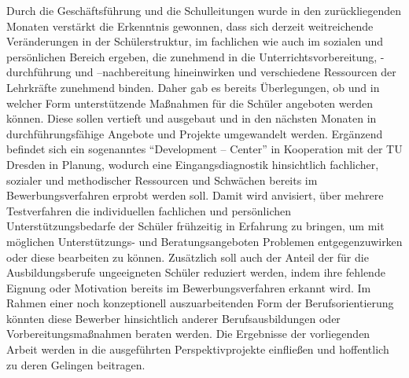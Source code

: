 Durch die Geschäftsführung und die Schulleitungen wurde in den zurückliegenden Monaten verstärkt die Erkenntnis gewonnen, dass sich derzeit weitreichende Veränderungen in der Schülerstruktur, im fachlichen wie auch im sozialen und persönlichen Bereich ergeben, die zunehmend in die Unterrichtsvorbereitung, -durchführung und –nachbereitung hineinwirken und verschiedene Ressourcen der Lehrkräfte zunehmend binden. Daher gab es bereits Überlegungen, ob und in welcher Form unterstützende Maßnahmen für die Schüler angeboten werden können. Diese sollen vertieft und ausgebaut und in den nächsten Monaten in durchführungsfähige Angebote und Projekte umgewandelt werden. Ergänzend befindet sich ein sogenanntes "`Development -- Center"' in Kooperation mit der TU Dresden in Planung, wodurch eine Eingangsdiagnostik hinsichtlich fachlicher, sozialer und methodischer Ressourcen und Schwächen bereits im Bewerbungsverfahren erprobt werden soll. Damit wird anvisiert, über mehrere Testverfahren die individuellen fachlichen und persönlichen Unterstützungsbedarfe der Schüler frühzeitig in Erfahrung zu bringen, um mit möglichen Unterstützungs- und Beratungsangeboten Problemen entgegenzuwirken oder diese bearbeiten zu können. Zusätzlich soll auch der Anteil der für die Ausbildungsberufe ungeeigneten Schüler reduziert werden, indem ihre fehlende Eignung oder Motivation bereits im Bewerbungsverfahren erkannt wird. Im Rahmen einer noch konzeptionell auszuarbeitenden Form der Berufsorientierung könnten diese Bewerber hinsichtlich anderer Berufsausbildungen oder Vorbereitungsmaßnahmen beraten werden. Die Ergebnisse der vorliegenden Arbeit werden in die ausgeführten Perspektivprojekte einfließen und hoffentlich zu deren Gelingen beitragen. 